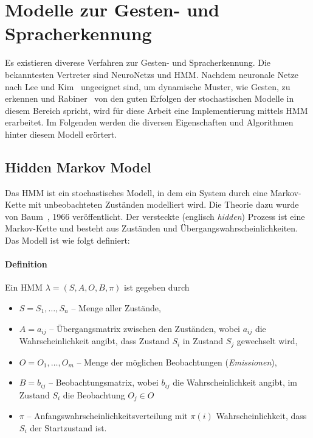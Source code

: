 \chapter{Modelle zur Gesten- und Spracherkennung}
\label{chap:Modelle}
Es existieren diverese Verfahren zur Gesten- und Spracherkennung. Die bekanntesten Vertreter sind \glspl{NeuroNetz} und \gls{HMM}.
Nachdem neuronale Netze nach Lee und Kim~\cite[p.~3]{bib:hmmlee} ungeeignet sind, um dynamische Muster, wie Gesten, zu erkennen und 
Rabiner~\cite[pp.~1]{bib:hmmrabiner} von den guten Erfolgen der stochastischen Modelle in diesem Bereich spricht,
wird f\"ur diese Arbeit eine Implementierung mittels \acrshort{HMM} erarbeitet.
\newline
Im Folgenden werden die diversen Eigenschaften und Algorithmen hinter diesem Modell er\"ortert.
\section{Hidden Markov Model}
Das \gls{HMM} ist ein stochastisches Modell, in dem ein System durch eine Markov-Kette mit unbeobachteten Zust\"anden modelliert wird.
Die Theorie dazu wurde von Baum~\cite{bib:hmmbaum}, 1966 ver\"offentlicht.
\newline
Der versteckte (englisch \textit{hidden}) Prozess ist eine Markov-Kette und besteht aus Zust\"anden und \"Ubergangswahrscheinlichkeiten.
Das Modell ist wie folgt definiert:

\subsubsection{Definition}
Ein \gls{HMM} $\lambda = (S, A, O, B, \pi)$ ist gegeben durch
\begin{itemize}
  \item $S = {S_1,\ldots,S_n}$ -- Menge aller Zust\"ande,
  \item $A = {a_{ij}}$ -- \"Ubergangsmatrix zwischen den Zust\"anden, wobei $a_{ij}$ die Wahrscheinlichkeit angibt, dass Zustand $S_i$ in Zustand $S_j$ gewechselt wird,
  \item $O = {O_1,\ldots,O_m}$ -- Menge der m\"oglichen Beobachtungen (\textit{Emissionen}),
  \item $B = {b_{ij}}$ -- Beobachtungsmatrix, wobei $b_{ij}$ die Wahrscheinlichkeit angibt, im Zustand $S_i$ die Beobachtung $O_j \in O$
  \item $\pi$ -- Anfangswahrscheinlichkeitsverteilung mit $\pi (i)$ Wahrscheinlichkeit, dass $S_i$ der Startzustand ist.
\end{itemize}

